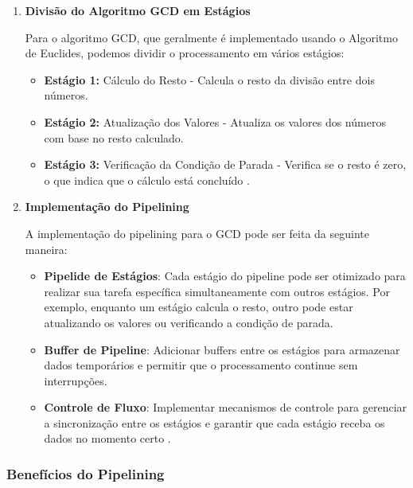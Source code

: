 \documentclass[a4paper,11pt]{article} %
\begin{document}
\begin{enumerate}
\item \textbf{Divisão do Algoritmo GCD em Estágios}



Para o algoritmo GCD, que geralmente é implementado usando o Algoritmo de Euclides, podemos dividir o processamento em vários estágios:

\begin{itemize}
    \item \textbf{Estágio 1:} Cálculo do Resto - Calcula o resto da divisão entre dois números.
    \item \textbf{Estágio 2:} Atualização dos Valores - Atualiza os valores dos números com base no resto calculado.
    \item \textbf{Estágio 3:} Verificação da Condição de Parada - Verifica se o resto é zero, o que indica que o cálculo está concluído \cite{Knuth1997}.
\end{itemize}

\item \textbf{Implementação do Pipelining}

A implementação do pipelining para o GCD pode ser feita da seguinte maneira:

\begin{itemize}
    \item \textbf{Pipelide de Estágios}: Cada estágio do pipeline pode ser otimizado para realizar sua tarefa específica simultaneamente com outros estágios. Por exemplo, enquanto um estágio calcula o resto, outro pode estar atualizando os valores ou verificando a condição de parada.
    \item \textbf{Buffer de Pipeline}: Adicionar buffers entre os estágios para armazenar dados temporários e permitir que o processamento continue sem interrupções.
    \item \textbf{Controle de Fluxo}: Implementar mecanismos de controle para gerenciar a sincronização entre os estágios e garantir que cada estágio receba os dados no momento certo \cite{Patterson2013}.
\end{itemize}

\end {enumerate}

\subsubsection{Benefícios do Pipelining}
\end{document}
